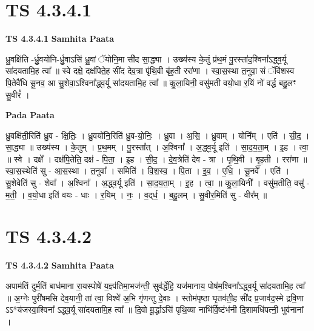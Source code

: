 \documentclass[17pt]{extarticle}
\begin{document}
\section*{ TS 4.3.4.1 }

\textbf{TS 4.3.4.1 } \newline
\textbf{Samhita Paata} \newline

ध्रु॒वक्षि॑ति -र्ध्रु॒वयो॑नि-र्ध्रु॒वाऽसि॑ ध्रु॒वां ॅयोनि॒मा सी॑द सा॒द्ध्या । उख्य॑स्य के॒तुं प्र॑थ॒मं पु॒रस्ता॑द॒श्विना᳚ऽद्ध्व॒र्यू सा॑दयतामि॒ह त्वा᳚ ॥ स्वे दक्षे॒ दक्ष॑पिते॒ह सी॑द देव॒त्रा पृ॑थि॒वी बृ॑ह॒ती ररा॑णा । स्वा॒स॒स्था त॒नुवा॒ सं ॅवि॑शस्व पि॒तेवै॑धि सू॒नव॒ आ सु॒शेवा॒ऽश्विना᳚द्ध्व॒र्यू सा॑दयतामि॒ह त्वा᳚ ॥ कु॒ला॒यिनी॒ वसु॑मती वयो॒धा र॒यिं नो॑ वर्द्ध बहु॒लꣳ सु॒वीरं᳚ । \newline

\textbf{Pada Paata} \newline

ध्रु॒वक्षि॑ती॒रिति॑ ध्रु॒व - क्षि॒तिः॒ । ध्रु॒वयो॑नि॒रिति॑ ध्रु॒व-यो॒निः॒ । ध्रु॒वा । अ॒सि॒ । ध्रु॒वाम् । योनि᳚म् । एति॑ । सी॒द॒ । सा॒द्ध्या ॥ उख्य॑स्य । के॒तुम् । प्र॒थ॒मम् । पु॒रस्ता᳚त् । अ॒श्विना᳚ । अ॒द्ध्व॒र्यू इति॑ । सा॒द॒य॒ता॒म् । इ॒ह । त्वा॒ ॥ स्वे । दक्षे᳚ । दक्ष॑पि॒तेति॒ दक्ष॑ - पि॒ता॒ । इ॒ह । सी॒द॒ । दे॒व॒त्रेति॑ देव - त्रा । पृ॒थि॒वी । बृ॒ह॒ती । ररा॑णा ॥ स्वा॒स॒स्थेति॑ सु - आ॒स॒स्था । त॒नुवा᳚ । समिति॑ । वि॒श॒स्व॒ । पि॒ता । इ॒व॒ । ए॒धि॒ । सू॒नवे᳚ । एति॑ । सु॒शेवेति॑ सु - शेवा᳚ । अ॒श्विना᳚ । अ॒द्ध्व॒र्यू इति॑ । सा॒द॒य॒ता॒म् । इ॒ह । त्वा॒ ॥ कु॒ला॒यिनी᳚ । वसु॑म॒तीति॒ वसु॑ - म॒ती॒ । व॒यो॒धा इति॑ वयः - धाः । र॒यिम् । नः॒ । व॒द्‌र्ध॒ । ब॒हु॒लम् । सु॒वीर॒मिति॑ सु - वीर᳚म् ॥  \newline




\section*{ TS 4.3.4.2 }

\textbf{TS 4.3.4.2 } \newline
\textbf{Samhita Paata} \newline

अपाम॑तिं दुर्म॒तिं बाध॑माना रा॒यस्पोषे॑ य॒ज्ञ्प॑तिमा॒भज॑न्ती॒ सुव॑र्द्धेहि॒ यज॑मानाय॒ पोष॑म॒श्विना᳚ऽद्ध्व॒र्यू सा॑दयतामि॒ह त्वा᳚ ॥ अ॒ग्नेः पुरी॑षमसि देव॒यानी॒ तां त्वा॒ विश्वे॑ अ॒भि गृ॑णन्तु दे॒वाः । स्तोम॑पृष्ठा घृ॒तव॑ती॒ह सी॑द प्र॒जाव॑द॒स्मे द्रवि॒णा ऽऽ*य॑जस्वा॒श्विना᳚ ऽद्ध्व॒र्यू सा॑दयतामि॒ह त्वा᳚ ॥ दि॒वो मू॒र्द्धाऽसि॑ पृथि॒व्या नाभि॑र्वि॒ष्टंभ॑नी दि॒शामधि॑पत्नी॒ भुव॑नानां । \newline
\end{document}
